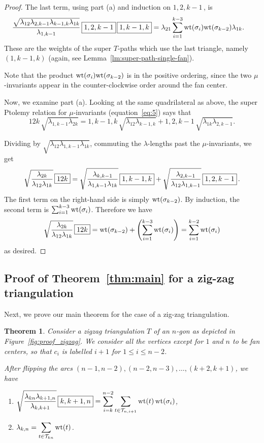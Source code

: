 \documentclass[pdftex]{sigma}
\numberwithin{equation}{section}
\newtheorem{Theorem}{Theorem}[section]
\DeclareMathOperator{\wt}{wt}
\renewcommand{\l}[2]{\lambda_{#1#2}}
\begin{document}
\begin{proof}
 The last term, using part (a) and induction on $\boxed{1,2,k-1}$\,, is
 \begin{align*}
 \frac{\sqrt{\lambda_{12}\lambda_{2,k-1}\lambda_{k-1,k}\lambda_{1k}}}{\lambda_{1,k-1}} \, \boxed{1,2,k-1} \, \boxed{1,k-1,k}
 &= \lambda_{21} \sum_{i=1}^{k-3} {\rm wt}(\sigma_i) {\rm wt}(\sigma_{k-2}) \lambda_{1k}.
 \end{align*}
 These are the weights of the super $T$-paths which use the last triangle, namely $(1,k-1,k)$ (again, see Lemma~\ref{lm:super-path-single-fan}).

 Note that the product ${\rm wt}(\sigma_i) {\rm wt}(\sigma_{k-2})$ is in the positive ordering,
 since the two $\mu$-invariants appear in the counter-clockwise order around the fan center.

 Now, we examine part (a). Looking at the same quadrilateral as above, the super Ptolemy relation for $\mu$-invariants (equation~\eqref{eq:5}) says that
 \[ \boxed{12k} \, \sqrt{\lambda_{1,k-1}\lambda_{2k}} = \boxed{1,k-1,k} \, \sqrt{\lambda_{12}\lambda_{k-1,k}} + \boxed{1,2,k-1} \, \sqrt{\lambda_{1k}\lambda_{2,k-1}}. \]

 Dividing by $\sqrt{\l12\lambda_{1,k-1}\l1k}$, commuting the $\lambda$-lengths past the $\mu$-invariants, we get
 \[\sqrt{\l2k\over \l12\l1k }\, \boxed{12k}=\sqrt{\l k{,k-1} \over \l1{,k-1}\l1k }\,\boxed{1,k-1,k} + \sqrt{\l2{,k-1} \over\l12\l1{,k-1}}\,\boxed{1,2,k-1}\,.\]
 The first term on the right-hand side is simply ${\rm wt}(\sigma_{k-2})$. By induction, the second term is $\sum_{i=1}^{k-3} {\rm wt}(\sigma_i)$. Therefore we have
 \[\sqrt{\l2k\over \l12\l1k }\, \boxed{12k}=\wt(\sigma_{k-2}) + \left(\sum_{i=1}^{k-3}\wt(\sigma_i)\right)=\sum_{i=1}^{k-2}\wt(\sigma_{i})\]
 as desired.
\end{proof}

\subsection{Proof of Theorem~\ref{thm:main} for a zig-zag triangulation}

Next, we prove our main theorem for the case of a zig-zag triangulation.

\begin{Theorem} \label{thm:proof_zigzag}
 Consider a zigzag triangulation $T$ of an $n$-gon as depicted in Figure~{\rm \ref{fig:proof_zigzag}}. We consider all the vertices
 except for $1$ and $n$ to be fan centers, so that $c_{i}$ is labelled $i+1$ for $1\leq i\leq n-2$.

 After flipping the arcs $(n-1,n-2),(n-2,n-3),\dots,(k+2,k+1)$, we have
 \begin{enumerate}\itemsep=0pt
 \item[$(a)$] $\displaystyle \sqrt{\lambda_{kn}\lambda_{k+1,n}\over\lambda_{k,k+1}} \, \boxed{k,k+1,n} = \sum_{i=k}^{n-2} \sum_{t\in\mathcal T_{n,i+1}} \wt(t) \wt(\sigma_i)$,
 \item[$(b)$] $\displaystyle \lambda_{k,n} = \sum_{t \in \mathcal{T}_{kn}} {\rm wt}(t)$.
 \end{enumerate}
\end{Theorem}
\end{document}
